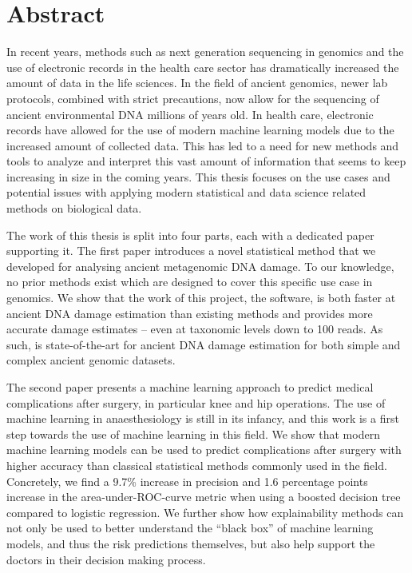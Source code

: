 \chapter{Abstract}


In recent years, methods such as next generation sequencing in genomics and the use of electronic records in the health care sector has dramatically increased the amount of data in the life sciences. In the field of ancient genomics, newer lab protocols, combined with strict precautions, now allow for the sequencing of ancient environmental DNA millions of years old. In health care, electronic records have allowed for the use of modern machine learning models due to the increased amount of collected data.
This has led to a need for new methods and tools to analyze and interpret this vast amount of information that seems to keep increasing in size in the coming years. This thesis focuses on the use cases and potential issues with applying modern statistical and data science related methods on biological data.

The work of this thesis is split into four parts, each with a dedicated paper supporting it. The first paper introduces a novel statistical method that we developed for analysing ancient metagenomic DNA damage. To our knowledge, no prior methods exist which are designed to cover this specific use case in genomics. We show that the work of this project, the \metaDMG software, is both faster at ancient DNA damage estimation than existing methods and provides more accurate damage estimates -- even at taxonomic levels down to 100 reads. As such, \metaDMG is state-of-the-art for ancient DNA damage estimation for both simple and complex ancient genomic datasets.

The second paper presents a machine learning approach to predict medical complications after surgery, in particular knee and hip operations. The use of machine learning in anaesthesiology is still in its infancy, and this work is a first step towards the use of machine learning in this field. We show that modern machine learning models can be used to predict complications after surgery with higher accuracy than classical statistical methods commonly used in the field. Concretely, we find a 9.7\% increase in precision and 1.6 percentage points increase in the area-under-ROC-curve metric when using a boosted decision tree compared to logistic regression. We further show how explainability methods can not only be used to better understand the ``black box'' of machine learning models, and thus the risk predictions themselves, but also help support the doctors in their decision making process.


